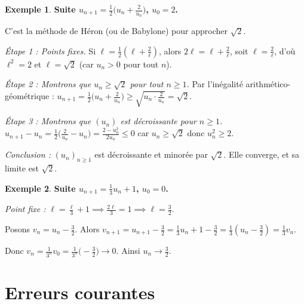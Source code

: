 \documentclass[12pt,a4paper,openany]{book}
\theoremstyle{definition}
\newtheorem{exemple}{Exemple}[chapter]
\begin{document}
\begin{exemple}\label{ex:recurrence-sqrt}
  \textbf{Suite $u_{n+1} = \frac{1}{2}\bigl(u_n + \frac{2}{u_n}\bigr)$, $u_0 = 2$.}

  C'est la méthode de Héron (ou de Babylone) pour approcher $\sqrt{2}$.

  \textit{Étape 1 : Points fixes.} Si $\ell = \frac{1}{2}(\ell + \frac{2}{\ell})$,
  alors $2\ell = \ell + \frac{2}{\ell}$, soit $\ell = \frac{2}{\ell}$, d'où $\ell^2 = 2$
  et $\ell = \sqrt{2}$ (car $u_n > 0$ pour tout $n$).

  \textit{Étape 2 : Montrons que $u_n \geq \sqrt{2}$ pour tout $n \geq 1$.}
  Par l'inégalité arithmético-géométrique :
  $u_{n+1} = \frac{1}{2}\bigl(u_n + \frac{2}{u_n}\bigr) \geq \sqrt{u_n \cdot \frac{2}{u_n}} = \sqrt{2}$.

  \textit{Étape 3 : Montrons que $(u_n)$ est décroissante pour $n \geq 1$.}
  $u_{n+1} - u_n = \frac{1}{2}\bigl(\frac{2}{u_n} - u_n\bigr) = \frac{2 - u_n^2}{2u_n} \leq 0$
  car $u_n \geq \sqrt{2}$ donc $u_n^2 \geq 2$.

  \textit{Conclusion :} $(u_n)_{n \geq 1}$ est décroissante et minorée par $\sqrt{2}$.
  Elle converge, et sa limite est $\sqrt{2}$.
\end{exemple}

\begin{exemple}\label{ex:recurrence-contraction}
  \textbf{Suite $u_{n+1} = \frac{1}{3}u_n + 1$, $u_0 = 0$.}

  \textit{Point fixe :} $\ell = \frac{\ell}{3} + 1 \implies \frac{2\ell}{3} = 1 \implies \ell = \frac{3}{2}$.

  Posons $v_n = u_n - \frac{3}{2}$. Alors $v_{n+1} = u_{n+1} - \frac{3}{2} = \frac{1}{3}u_n + 1 - \frac{3}{2} = \frac{1}{3}(u_n - \frac{3}{2}) = \frac{1}{3}v_n$.

  Donc $v_n = \frac{1}{3^n}v_0 = \frac{1}{3^n}\bigl(-\frac{3}{2}\bigr) \to 0$.
  Ainsi $u_n \to \frac{3}{2}$.
\end{exemple}

\section{Erreurs courantes}\label{sec:suites:erreurs}
\end{document}
